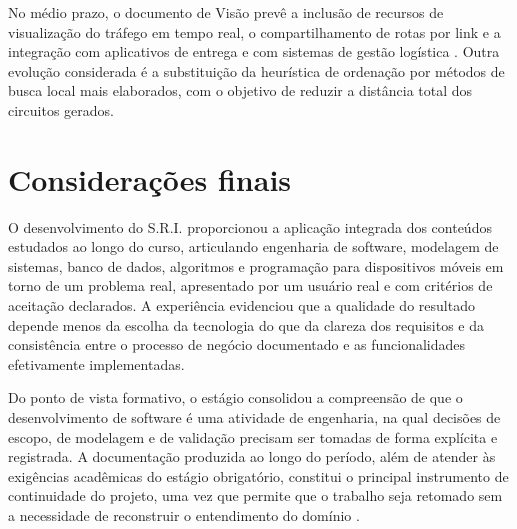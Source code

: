 No médio prazo, o documento de Visão prevê a inclusão de recursos de visualização do tráfego em tempo real, o compartilhamento de rotas por link e a integração com aplicativos de entrega e com sistemas de gestão logística \cite{sriVisao2025}. Outra evolução considerada é a substituição da heurística de ordenação por métodos de busca local mais elaborados, com o objetivo de reduzir a distância total dos circuitos gerados.

\section{Considerações finais}

O desenvolvimento do S.R.I. proporcionou a aplicação integrada dos conteúdos estudados ao longo do curso, articulando engenharia de software, modelagem de sistemas, banco de dados, algoritmos e programação para dispositivos móveis em torno de um problema real, apresentado por um usuário real e com critérios de aceitação declarados. A experiência evidenciou que a qualidade do resultado depende menos da escolha da tecnologia do que da clareza dos requisitos e da consistência entre o processo de negócio documentado e as funcionalidades efetivamente implementadas.

Do ponto de vista formativo, o estágio consolidou a compreensão de que o desenvolvimento de software é uma atividade de engenharia, na qual decisões de escopo, de modelagem e de validação precisam ser tomadas de forma explícita e registrada. A documentação produzida ao longo do período, além de atender às exigências acadêmicas do estágio obrigatório, constitui o principal instrumento de continuidade do projeto, uma vez que permite que o trabalho seja retomado sem a necessidade de reconstruir o entendimento do domínio \cite{sommerville2019}.
